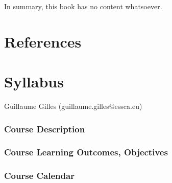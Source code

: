 \documentclass[
  letterpaper,
  DIV=11,
  numbers=noendperiod]{scrreprt}
\newlength{\cslhangindent}
\newenvironment{CSLReferences}[2] %
 {\begin{list}{}{%
  \setlength{\itemindent}{0pt}
  \setlength{\leftmargin}{0pt}
  \setlength{\parsep}{0pt}
  \ifodd #1
   \setlength{\leftmargin}{\cslhangindent}
   \setlength{\itemindent}{-1\cslhangindent}
  \fi
  \setlength{\itemsep}{#2\baselineskip}}}
 {\end{list}}
\begin{document}
In summary, this book has no content whatsoever.


\chapter*{References}\label{references}


\label{refs}
\begin{CSLReferences}{0}{1}
\end{CSLReferences}

\cleardoublepage
{}
{}
\appendix

\chapter{Syllabus}\label{syllabus}

Guillaume Gilles (guillaume.gilles@essca.eu)

\subsection{Course Description}\label{course-description}

\subsection{Course Learning Outcomes,
Objectives}\label{course-learning-outcomes-objectives}

\subsection{Course Calendar}\label{course-calendar}
\end{document}

